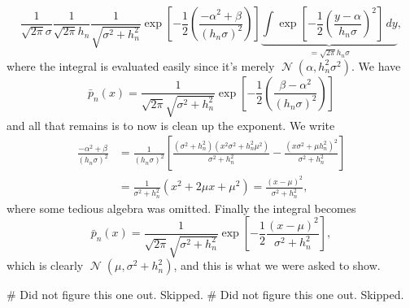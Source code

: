 \documentclass[12pt, a4paper]{article}
\DeclareMathOperator{\N}{\mathcal{N}}
\begin{document}
\begin{easylist}[enumerate]
	\begin{equation*}
	\frac{1}{\sqrt{2 \pi} \sigma}
	\frac{1}{\sqrt{2 \pi} h_n} \frac{1}{\sqrt{\sigma^2 + h_n^2}}
	\exp \left[ -\frac{1}{2} \left( \frac{-\alpha^2 + \beta}{(h_n \sigma)^2}
	\right) \right]
	\underbrace{\int \exp \left[ 
	-\frac{1}{2} \left( \frac{y - \alpha}{h_n \sigma}
	\right)^2 \right]
	 \, dy}_{= \sqrt{2 \pi} h_n \sigma},
	\end{equation*}
	where the integral is evaluated easily since it's merely $\N(\alpha, h_n^2 \sigma^2)$. 
	We have
	\begin{equation*}
	\bar{p}_n(x) = 	 \frac{1}{ \sqrt{2 \pi} \sqrt{\sigma^2 + h_n^2}}
	\exp \left[ -\frac{1}{2} \left( \frac{ \beta - \alpha^2}{(h_n \sigma)^2}
	\right) \right]
	\end{equation*}
	and all that remains is to now is clean up the exponent.
	We write
	\begin{align*}
		\frac{-\alpha^2 + \beta}{(h_n \sigma)^2}
		& = \frac{1}{(h_n \sigma)^2}
		\left[
		\frac{(\sigma^2 + h_n^2) \left( x^2 \sigma^2 + h_n^2 \mu^2 \right)}{\sigma^2 + h_n^2}
		-
		\frac{\left( x \sigma^2 + \mu h_n^2 \right)^2}{\sigma^2 + h_n^2}
		\right] \\
		&= \frac{1}{\sigma^2 + h_n^2} \left( x^2 + 2\mu x + \mu^2 \right)
		= \frac{\left( x - \mu \right)^2}{\sigma^2 + h_n^2} ,
	\end{align*}
	where some tedious algebra was omitted.
	Finally the integral becomes
	\begin{equation*}
	\bar{p}_n(x) = \frac{1}{\sqrt{2 \pi} \sqrt{\sigma^2 + h_n^2}} 
	\exp \left[ -\frac{1}{2} \frac{\left( x - \mu \right)^2}{\sigma^2 + h_n^2} \right],
	\end{equation*}
	which is clearly $\N(\mu, \sigma^2 + h_n^2)$, and this is what we were asked to show.
	
	# Did not figure this one out. Skipped.
	# Did not figure this one out. Skipped.
\end{easylist}
\end{document}
